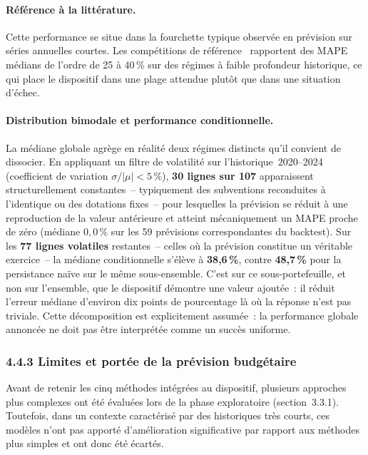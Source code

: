 \paragraph{R\'ef\'erence \`a la litt\'erature.}
Cette performance se situe dans la fourchette typique observ\'ee
en pr\'evision sur s\'eries annuelles courtes. Les comp\'etitions de
r\'ef\'erence~\citep{Makridakis2018} rapportent des MAPE m\'edians
de l'ordre de 25 \`a 40\,\% sur des r\'egimes \`a faible profondeur
historique, ce qui place le dispositif dans une plage attendue
plut\^ot que dans une situation d'\'echec.

\paragraph{Distribution bimodale et performance conditionnelle.}
La m\'ediane globale agr\`ege en r\'ealit\'e deux r\'egimes distincts
qu'il convient de dissocier. En appliquant un filtre de volatilit\'e
sur l'historique~2020--2024 (coefficient de variation $\sigma/|\mu|<5\,\%$),
\textbf{30 lignes sur 107} apparaissent structurellement constantes~--
typiquement des subventions reconduites \`a l'identique ou des dotations
fixes~-- pour lesquelles la \og pr\'evision \fg{} se r\'eduit \`a une
reproduction de la valeur ant\'erieure et atteint m\'ecaniquement un
MAPE proche de z\'ero (m\'ediane $0{,}0\,\%$ sur les 59 pr\'evisions
correspondantes du backtest). Sur les \textbf{77 lignes volatiles}
restantes~-- celles o\`u la pr\'evision constitue un v\'eritable
exercice~-- la m\'ediane conditionnelle s'\'el\`eve \`a \textbf{38{,}6\,\%},
contre \textbf{48{,}7\,\%} pour la persistance na\"ive sur le m\^eme
sous-ensemble. C'est sur ce sous-portefeuille, et non sur l'ensemble,
que le dispositif d\'emontre une valeur ajout\'ee~: il r\'eduit l'erreur
m\'ediane d'environ dix points de pourcentage l\`a o\`u la r\'eponse
n'est pas triviale. Cette d\'ecomposition est explicitement assum\'ee~:
la performance globale annonc\'ee ne doit pas \^etre interpr\'et\'ee
comme un succ\`es uniforme.

\subsubsection*{4.4.3 \quad Limites et port\'ee de la pr\'evision budg\'etaire}

Avant de retenir les cinq m\'ethodes int\'egr\'ees au dispositif, plusieurs
approches plus complexes ont \'et\'e \'evalu\'ees lors de la phase
exploratoire (section~3.3.1). Toutefois, dans un contexte caract\'eris\'e
par des historiques tr\`es courts, ces mod\`eles n'ont pas apport\'e
d'am\'elioration significative par rapport aux m\'ethodes plus simples
et ont donc \'et\'e \'ecart\'es.

